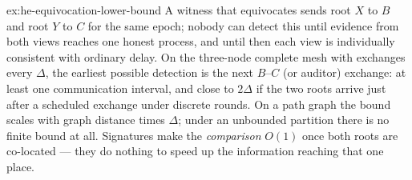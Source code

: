 \documentclass[11pt,a4paper]{article}
\theoremstyle{definition}
\theoremstyle{definition}
\theoremstyle{remark}
\begin{document}
\begin{pdsolution}{ex:he-equivocation-lower-bound}
A witness that equivocates sends root $X$ to $B$ and root $Y$ to $C$ for the
same epoch; nobody can detect this until evidence from both views reaches one
honest process, and until then each view is individually consistent with
ordinary delay. On the three-node complete mesh with exchanges every $\Delta$,
the earliest possible detection is the next $B$--$C$ (or auditor) exchange: at
least one communication interval, and close to $2\Delta$ if the two roots arrive
just after a scheduled exchange under discrete rounds. On a path graph the bound
scales with graph distance times $\Delta$; under an unbounded partition there is
no finite bound at all. Signatures make the \emph{comparison} $O(1)$ once both
roots are co-located --- they do nothing to speed up the information reaching
that one place.
\end{pdsolution}

\end{document}
